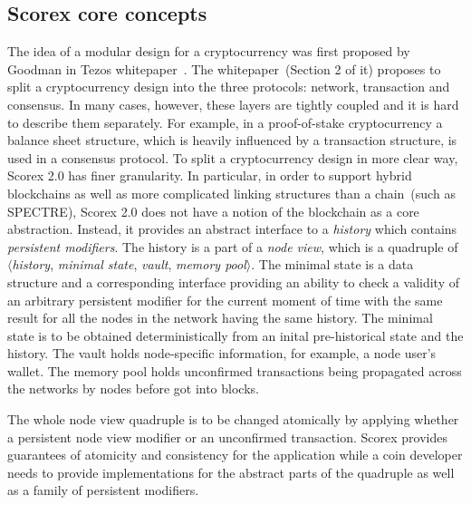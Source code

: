 
\subsection{Scorex core concepts}


The idea of a modular design for a cryptocurrency was first proposed by Goodman in Tezos whitepaper~\cite{goodmantezos}. The whitepaper~(Section 2 of it) proposes to split a cryptocurrency design into the three protocols: network, transaction and consensus. In many cases, however, these layers are tightly coupled and it is hard to describe them separately. For example, in a proof-of-stake cryptocurrency a balance sheet structure, which is heavily influenced by a transaction structure, is used in a consensus protocol. To split a cryptocurrency design in more clear way, Scorex 2.0 has finer granularity. In particular, in order to support hybrid blockchains as well as more complicated linking structures than a chain~(such as SPECTRE\cite{EPRINT:SomLewZoh16}), Scorex 2.0 does not have a notion of the blockchain as a core abstraction. Instead, it provides an abstract interface to a \textit{history} which contains \textit{persistent modifiers}. The history is a part of a \textit{node view}, which is a quadruple of $\langle$\textit{history}, \textit{minimal state}, \textit{vault}, \textit{memory pool}$\rangle$. The minimal state is a data structure and a corresponding interface providing an ability to check a validity of an arbitrary persistent modifier for the current moment of time with the same result for all the nodes in the network having the same history. The minimal state is to be obtained deterministically from an inital pre-historical state and the history. The vault holds node-specific information, for example, a node user's wallet. The memory pool holds unconfirmed transactions being propagated across the networks by nodes before got into blocks. 

The whole node view quadruple is to be changed atomically by applying whether a persistent node view modifier or an unconfirmed transaction. Scorex provides guarantees of atomicity and consistency for the application while a coin developer needs to provide implementations for the abstract parts of the quadruple as well as a family of persistent modifiers.